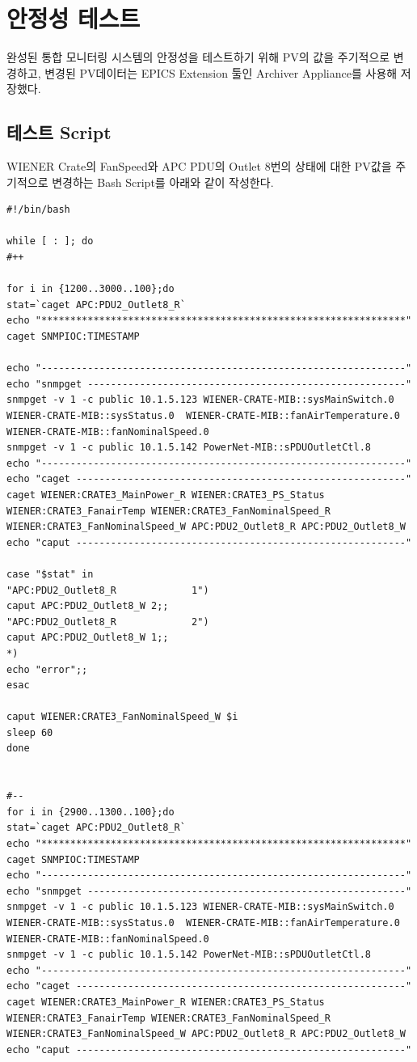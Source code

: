 \documentclass[11pt
  , a4paper
  , article
  , oneside
]{memoir}
\begin{document}
\section{안정성 테스트}
완성된 통합 모니터링 시스템의 안정성을 테스트하기 위해 PV의 값을 주기적으로 변경하고, 변경된 PV데이터는 EPICS Extension 툴인 Archiver Appliance를 사용해 저장했다.

\subsection{테스트 Script}
WIENER Crate의 FanSpeed와 APC PDU의 Outlet 8번의 상태에 대한 PV값을 주기적으로 변경하는 Bash Script를 아래와 같이 작성한다. 

\begin{lstlisting}[style=termstyle]
#!/bin/bash

while [ : ]; do  
#++

for i in {1200..3000..100};do
stat=`caget APC:PDU2_Outlet8_R`
echo "***************************************************************"
caget SNMPIOC:TIMESTAMP

echo "---------------------------------------------------------------"
echo "snmpget -------------------------------------------------------"
snmpget -v 1 -c public 10.1.5.123 WIENER-CRATE-MIB::sysMainSwitch.0  WIENER-CRATE-MIB::sysStatus.0  WIENER-CRATE-MIB::fanAirTemperature.0 WIENER-CRATE-MIB::fanNominalSpeed.0
snmpget -v 1 -c public 10.1.5.142 PowerNet-MIB::sPDUOutletCtl.8
echo "---------------------------------------------------------------"
echo "caget ---------------------------------------------------------"
caget WIENER:CRATE3_MainPower_R WIENER:CRATE3_PS_Status WIENER:CRATE3_FanairTemp WIENER:CRATE3_FanNominalSpeed_R WIENER:CRATE3_FanNominalSpeed_W APC:PDU2_Outlet8_R APC:PDU2_Outlet8_W 
echo "caput ---------------------------------------------------------"

case "$stat" in
"APC:PDU2_Outlet8_R             1")
caput APC:PDU2_Outlet8_W 2;;
"APC:PDU2_Outlet8_R             2")
caput APC:PDU2_Outlet8_W 1;;
*)
echo "error";;
esac

caput WIENER:CRATE3_FanNominalSpeed_W $i
sleep 60
done


#--
for i in {2900..1300..100};do
stat=`caget APC:PDU2_Outlet8_R`
echo "***************************************************************"
caget SNMPIOC:TIMESTAMP
echo "---------------------------------------------------------------"
echo "snmpget -------------------------------------------------------"
snmpget -v 1 -c public 10.1.5.123 WIENER-CRATE-MIB::sysMainSwitch.0  WIENER-CRATE-MIB::sysStatus.0  WIENER-CRATE-MIB::fanAirTemperature.0 WIENER-CRATE-MIB::fanNominalSpeed.0
snmpget -v 1 -c public 10.1.5.142 PowerNet-MIB::sPDUOutletCtl.8
echo "---------------------------------------------------------------"
echo "caget ---------------------------------------------------------"
caget WIENER:CRATE3_MainPower_R WIENER:CRATE3_PS_Status WIENER:CRATE3_FanairTemp WIENER:CRATE3_FanNominalSpeed_R WIENER:CRATE3_FanNominalSpeed_W APC:PDU2_Outlet8_R APC:PDU2_Outlet8_W 
echo "caput ---------------------------------------------------------"


\end{lstlisting}
\end{document}
